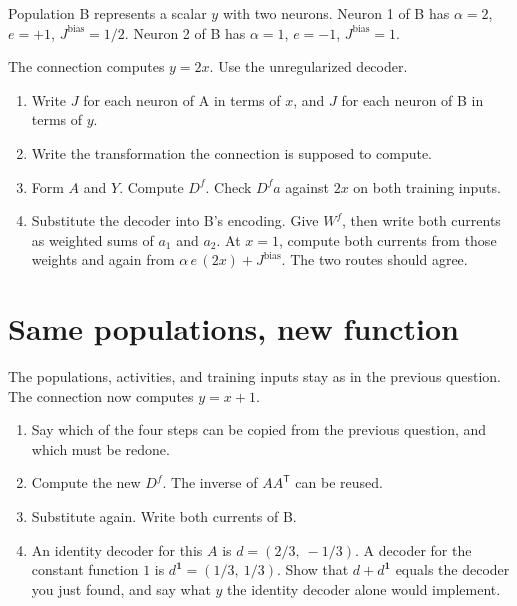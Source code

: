 \documentclass[11pt,letterpaper]{article}
\newcommand{\Jb}{J^{\mathrm{bias}}}
\begin{document}
Population B represents a scalar $y$ with two neurons.
Neuron 1 of B has $\alpha = 2$, $e = +1$, $\Jb = 1/2$.
Neuron 2 of B has $\alpha = 1$, $e = -1$, $\Jb = 1$.

The connection computes $y = 2x$. Use the unregularized decoder.

\begin{enumerate}
\item Write $J$ for each neuron of A in terms of $x$, and $J$ for each neuron of B in terms of $y$.
\item Write the transformation the connection is supposed to compute.
\item Form $A$ and $Y$. Compute $D^f$. Check $D^f a$ against $2x$ on both training inputs.
\item Substitute the decoder into B's encoding. Give $W^f$, then write both currents as weighted sums of $a_1$ and $a_2$. At $x = 1$, compute both currents from those weights and again from $\alpha\, e\, (2x) + \Jb$. The two routes should agree.
\end{enumerate}

\section{Same populations, new function}

The populations, activities, and training inputs stay as in the previous question. The connection now computes $y = x + 1$.

\begin{enumerate}
\item Say which of the four steps can be copied from the previous question, and which must be redone.
\item Compute the new $D^f$. The inverse of $AA^{\mathsf T}$ can be reused.
\item Substitute again. Write both currents of B.
\item An identity decoder for this $A$ is $d = (2/3,\ -1/3)$. A decoder for the constant function $1$ is $d^{\mathbf 1} = (1/3,\ 1/3)$. Show that $d + d^{\mathbf 1}$ equals the decoder you just found, and say what $y$ the identity decoder alone would implement.
\end{enumerate}
\end{document}

